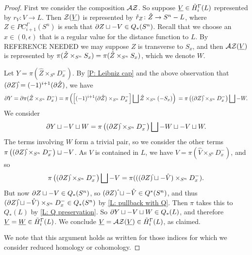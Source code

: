\begin{proof}
	First we consider the composition $\mathcal{A} \mathcal{Z}$.
	So suppose $\underline{V} \in \tilde H_i^\Gamma(L)$ represented by $r_V \colon V \to L$.
	Then $\mathcal{Z}(\underline{V})$ is represented by $\mathring{r}_Z \colon \mathring{Z} \to S^n-L$, where $Z \in PC_{i+1}^\Gamma(S^n)$ is such that $\partial Z \sqcup -V \in Q_*(S^n)$.
	Recall that we choose an $x \in (0,\epsilon)$ that is a regular value for the distance function to $L$.
	By REFERENCE NEEDED we may suppose $Z$ is transverse to $S_x$, and then $\mathcal{A} \mathcal{Z}(\underline{V})$ is represented by $\pi(\mathring{Z} \times_{S^n} S_x) = \pi(\hat Z \times_{S^n} S_x)$, which we denote $W$.

	Let $Y = \pi(\hat Z \times_{S^n} D_x^-)$.
	By \cref{P: Leibniz cap} and the above observation that $(\bd Z)\hat{\vrule height1.3ex width0pt} = (-1)^{i+1} (\bd \hat Z)$, we have
	\begin{equation*}
		\bd Y = \bd \pi(\hat Z \times_{S^n} D_x^-)
		= \pi\left(\left[(-1)^{i+1} (\bd \hat Z) \times_{S^n} D_x^-\right] \bigsqcup \hat Z \times_{S^n} (-S_x)\right)\\
		= \pi\left((\bd Z)\hat{\vrule height1.3ex width0pt} \times_{S^n} D_x^- \right) \bigsqcup -W.
	\end{equation*}
	We consider
	\begin{equation*}
		\bd Y \sqcup -V\sqcup W =\pi\left((\bd Z)\hat{\vrule height1.3ex width0pt} \times_{S^n} D_x^- \right) \bigsqcup -W \sqcup -V \sqcup W.
	\end{equation*}
	The terms involving $W$ form a trivial pair, so we consider the other terms $\pi\left((\bd Z)\hat{\vrule height1.3ex width0pt} \times_{S^n} D_x^- \right) \sqcup -V$.
	As $V$ is contained in $L$, we have $V = \pi(\hat V \times_{S^n} D_x^-)$, and so
	$$\pi\left((\bd Z)\hat{\vrule height1.3ex width0pt} \times_{S^n} D_x^- \right) \bigsqcup -V = \pi(((\bd Z)\hat{\vrule height1.3ex width0pt} \sqcup -\hat V) \times_{S^n} D_x^-).$$
	But now $\partial Z \sqcup -V \in Q_*(S^n)$, so $(\bd Z)\,\hat{\vrule height1.3ex width0pt} \sqcup -\hat V \in Q^*(S^n)$, and thus $(\bd Z)\hat{\vrule height1.3ex width0pt} \sqcup -\hat V) \times_{S^n} D_x^- \in Q_*(S^n)$ by \cref{L: pullback with Q}.
	Then $\pi$ takes this to $Q_*(L)$ by \cref{L: Q preservation}.
	So $\partial Y \sqcup -V \sqcup W \in Q_*(L)$, and therefore $\underline{V} = \underline{W} \in \tilde H_i^\Gamma(L)$.
	We conclude $\underline{V} = \mathcal{A} \mathcal{Z}(\underline{V}) \in \tilde H_i^\Gamma(L)$, as claimed.

	We note that this argument holds as written for those indices for which we consider reduced homology or cohomology.


\end{proof}
